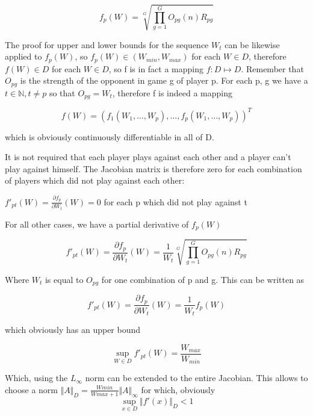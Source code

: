 \documentclass[a4paper]{article}
\begin{document}
\begin{equation}
f_p(W) = \sqrt[G]{\displaystyle\prod_{g=1}^{G}{O_{pg}(n)R_{pg}}} 
\end{equation}

The proof for upper and lower bounds for the sequence $ W_t $ can be likewise applied to $ f_p(W) $, so 
$ f_p(W) \in (W_{min},W_{max})$ for each $W \in D$, therefore
$ f(W) \in D $ for each $ W \in D$, so f is in fact a mapping $ f : D \mapsto D $.
\newline\newline
Remember that $ O_{pg} $ is the strength of the opponent in game g of player p.  For each p, g  we have a $ t
\in \mathbb{N}, t \neq p$ so that $ O_{pg} = W_t $, therefore f is indeed a mapping 

$$
f(W) = (f_1(W_1, ..., W_p), ..., f_p(W_1,...,W_p))^T
$$

which is obviously continuously differentiable in all of D.

\pagebreak
It is not required that each player plays against each other and a player can't play against himself.
The Jacobian matrix is therefore zero for each combination of players which did not play against each other:
\newline\newline
\begin{center}
$ f'_{pt}(W) = \frac{\partial f_p}{\partial W_t}(W)  = 0 $  for each p which did not play against t 
\end{center}

For all other cases, we have a partial derivative of $ f_p(W) $ 

\begin{equation}
f'_{pt}(W) = \frac{\partial f_p}{\partial W_t}(W) = \frac{1}{W_t}\sqrt[G]{\displaystyle\prod_{g=1}^{G}{O_{pg}(n)R_{pg}}} 
\end{equation}

Where $ W_t $ is equal to $ O_{pg} $ for one combination of p and g. This can be written as 

$$
f'_{pt}(W) = \frac{\partial f_p}{\partial W_{t}}(W) = \frac{1}{W_t} f_p(W)
$$

which obviously has an upper bound

\begin{equation}
\sup_{W \in D} f'_{pt}(W) = \frac{W_{max}}{W_{min}} 
\end{equation}

Which, using the $ L_{\infty} $ norm can be extended to the entire Jacobian.
\newline\newline
This allows to choose a norm $ \Vert A \Vert _D =   \frac{W{min}}{{W{max}+1}} \Vert A \Vert _{\infty} $ for which, obviously 
$$
\sup _{x \in D} \Vert f'(x) \Vert _D < 1
$$
\end{document}
